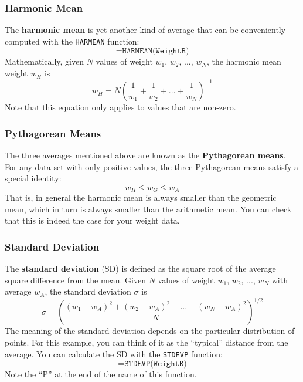 \subsubsection{Harmonic Mean}
The \textbf{harmonic mean} is yet another kind of average that can be conveniently computed with the \texttt{HARMEAN} function:
\begin{equation}
    \texttt{=HARMEAN(WeightB)}
\end{equation}
Mathematically, given $N$ values of weight $w_{1}$, $w_{2}$, ..., $w_{N}$, the harmonic mean weight $w_{H}$ is
\begin{equation}
    w_{H} = N \left( \frac{1}{w_{1}} + \frac{1}{w_{2}} + ... + \frac{1}{w_{N}} \right)^{-1}
\end{equation}
Note that this equation only applies to values that are non-zero.
\subsubsection{Pythagorean Means}
The three averages mentioned above are known as the \textbf{Pythagorean means}. For any data set with only positive values, the three Pythagorean means satisfy a special identity:
\begin{equation}
    w_{H} \leq w_{G} \leq w_{A}
\end{equation}
That is, in general the harmonic mean is always smaller than the geometric mean, which in turn is always smaller than the arithmetic mean. You can check that this is indeed the case for your weight data.
\subsubsection{Standard Deviation}
The \textbf{standard deviation} (SD) is defined as the square root of the average square difference from the mean. Given $N$ values of weight $w_{1}$, $w_{2}$, ..., $w_{N}$ with average $w_{A}$, the standard deviation $\sigma$ is
\begin{equation}
    \sigma = \left( \frac{(w_{1} - w_{A})^{2} + (w_{2} - w_{A})^{2} + ... + (w_{N} - w_{A})^{2}}{N}  \right)^{1/2}
\end{equation}
The meaning of the standard deviation depends on the particular distribution of points. For this example, you can think of it as the ``typical'' distance from the average. You can calculate the SD with the \texttt{STDEVP} function:
\begin{equation}
    \texttt{=STDEVP(WeightB)}
\end{equation}
Note the ``P'' at the end of the name of this function.

